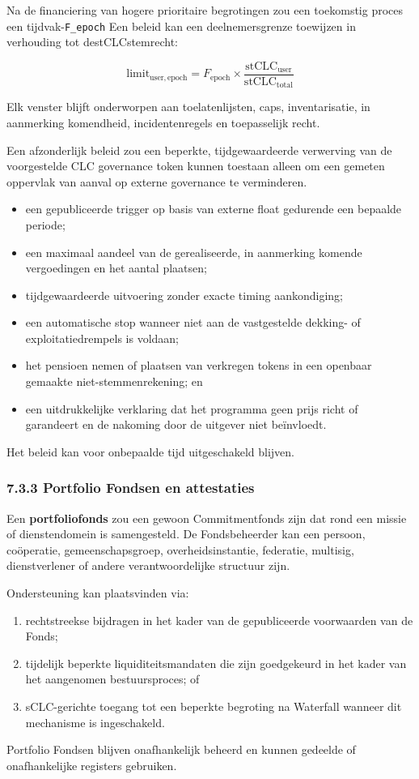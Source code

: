 \documentclass[11pt]{article}
\begin{document}
Na de financiering van hogere prioritaire begrotingen zou een toekomstig proces een tijdvak-\texttt{F\_epoch} Een beleid kan een deelnemersgrenze toewijzen in verhouding tot destCLCstemrecht:

\[
\mathrm{limit}_{\mathrm{user,epoch}} = F_{\mathrm{epoch}} \times \frac{\mathrm{stCLC}_{\mathrm{user}}}{\mathrm{stCLC}_{\mathrm{total}}}
\]

Elk venster blijft onderworpen aan toelatenlijsten, caps, inventarisatie, in aanmerking komendheid, incidentenregels en toepasselijk recht.

Een afzonderlijk beleid zou een beperkte, tijdgewaardeerde verwerving van de voorgestelde CLC governance token kunnen toestaan alleen om een gemeten oppervlak van aanval op externe governance te verminderen.

\begin{itemize}[leftmargin=*]
\item een gepubliceerde trigger op basis van externe float gedurende een bepaalde periode;
\item een maximaal aandeel van de gerealiseerde, in aanmerking komende vergoedingen en het aantal plaatsen;
\item tijdgewaardeerde uitvoering zonder exacte timing aankondiging;
\item een automatische stop wanneer niet aan de vastgestelde dekking- of exploitatiedrempels is voldaan;
\item het pensioen nemen of plaatsen van verkregen tokens in een openbaar gemaakte niet-stemmenrekening; en
\item een uitdrukkelijke verklaring dat het programma geen prijs richt of garandeert en de nakoming door de uitgever niet beïnvloedt.
\end{itemize}
Het beleid kan voor onbepaalde tijd uitgeschakeld blijven.

\subsubsection*{7.3.3 Portfolio Fondsen en attestaties}

Een \textbf{portfoliofonds} zou een gewoon Commitmentfonds zijn dat rond een missie of dienstendomein is samengesteld. De Fondsbeheerder kan een persoon, coöperatie, gemeenschapsgroep, overheidsinstantie, federatie, multisig, dienstverlener of andere verantwoordelijke structuur zijn.

Ondersteuning kan plaatsvinden via:

\begin{enumerate}[leftmargin=*]
\item rechtstreekse bijdragen in het kader van de gepubliceerde voorwaarden van de Fonds;
\item tijdelijk beperkte liquiditeitsmandaten die zijn goedgekeurd in het kader van het aangenomen bestuursproces; of
\item sCLC-gerichte toegang tot een beperkte begroting na Waterfall wanneer dit mechanisme is ingeschakeld.
\end{enumerate}
Portfolio Fondsen blijven onafhankelijk beheerd en kunnen gedeelde of onafhankelijke registers gebruiken.
\end{document}
